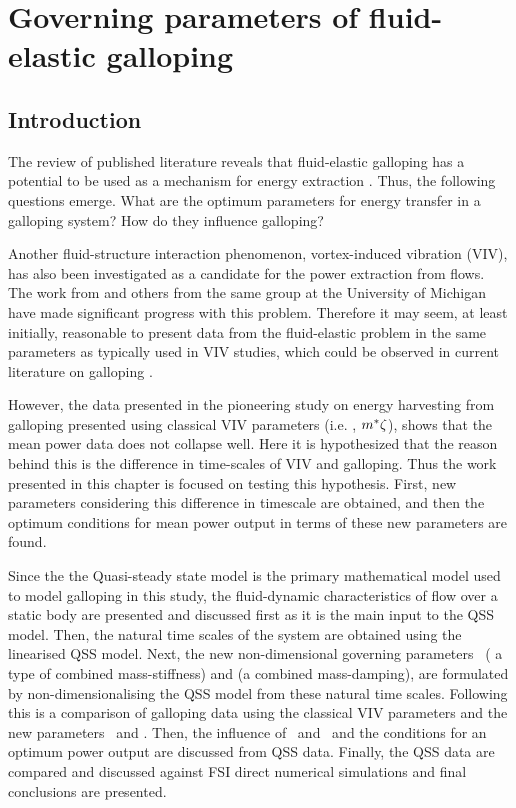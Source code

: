 \chapter{Governing parameters of fluid-elastic galloping}
\label{chap:pi_1_pi2}
\section{Introduction}

The review of published literature reveals that fluid-elastic galloping has a potential to be used as a mechanism for energy extraction \citep{Barrero-Gil2010a}. Thus, the following questions emerge. What are the optimum parameters for energy transfer in a galloping system? How do they influence galloping?

Another fluid-structure interaction phenomenon, vortex-induced vibration (VIV), has also been investigated as a candidate for the power extraction from flows. The work from \citet{Bernitsas2008a-concept, Bernitsas2009, Raghavan2010a, Lee2011b} and others from the same group at the University of Michigan have made significant progress with this problem. Therefore it may seem, at least initially, reasonable to present data from the fluid-elastic problem in the same parameters as typically used in VIV studies, which could be observed in current literature on galloping \citep{Barrero-Gil2009,Barrero-Gil2010a,Parkinson1964}.



However, the data presented in the pioneering study on energy harvesting from galloping  \citep{Barrero-Gil2010a} presented using classical VIV parameters (i.e. \ustar, $m^{*}\zeta$), shows that the mean power data does not collapse well. Here it is hypothesized that the reason behind this is the difference in time-scales of VIV and galloping. Thus the work presented in this chapter is focused on testing this hypothesis. First, new parameters considering this difference in timescale are obtained, and then the optimum conditions for mean power output in terms of these new parameters are found. 

Since the the Quasi-steady state model is the primary mathematical model used to model galloping in this study, the fluid-dynamic characteristics of flow over a static body are presented and discussed first as it is the main input to the QSS model. Then, the natural time scales of the system are obtained using the linearised QSS model. Next, the new non-dimensional governing parameters  \massstiff\ ( a type of combined mass-stiffness) and \massdamp (a combined mass-damping), are formulated by non-dimensionalising the QSS model from these natural time scales. Following this is a comparison of galloping data using the classical VIV parameters and the new parameters \massstiff\ and \massdamp. Then, the influence of \massstiff \ and \massdamp \ and the conditions for an optimum power output are discussed from QSS data. Finally, the QSS data are compared and discussed against FSI direct numerical simulations and final conclusions are presented.

